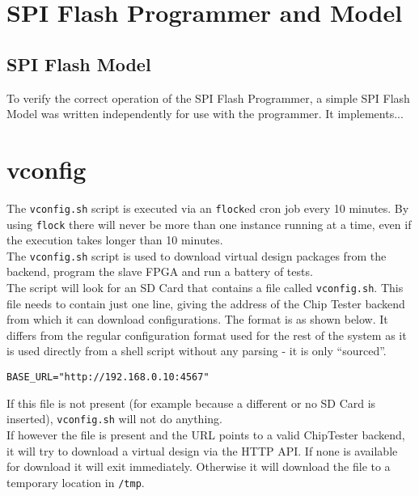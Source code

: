 

\newpage
\section{SPI Flash Programmer and Model}

\subsection{SPI Flash Model}
To verify the correct operation of the SPI Flash Programmer, a simple SPI Flash
Model was written independently for use with the programmer. It implements...



\newpage
\section{vconfig}
The \texttt{vconfig.sh} script is executed via an \texttt{flock}ed cron job every 10 minutes.
By using \texttt{flock} there will never be more than one instance running at a time, even if
the execution takes longer than 10 minutes.
\\

The \texttt{vconfig.sh} script is used to download virtual design packages from the
backend, program the slave FPGA and run a battery of tests.
\\

The script will look for an SD Card that contains a file called \texttt{vconfig.sh}. This
file needs to contain just one line, giving the address of the Chip Tester backend from
which it can download configurations. The format is as shown below. It differs from the
regular configuration format used for the rest of the system as it is used directly from
a shell script without any parsing - it is only ``sourced''.
\lstset{basicstyle=\scriptsize\ttfamily}
\begin{lstlisting}
BASE_URL="http://192.168.0.10:4567"
\end{lstlisting}

If this file is not present (for example because a different or no SD Card is inserted),
\texttt{vconfig.sh} will not do anything.
\\

If however the file is present and the URL points to a valid ChipTester backend, it will
try to download a virtual design via the HTTP API. If none is available for download it
will exit immediately. Otherwise it will download the file to a temporary location in \texttt{/tmp}.
\\

